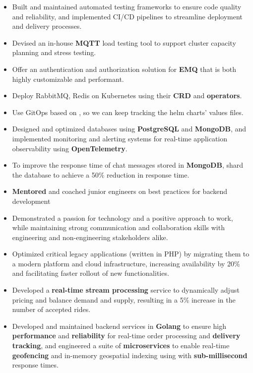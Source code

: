 \vspace{0.5cm}
\begin{itemize}
  \item Built and maintained automated testing frameworks to ensure code quality and reliability,
    and implemented CI/CD pipelines to streamline deployment and delivery processes.
  \item Devised an in-house \textbf{MQTT} load testing tool to support cluster capacity planning and stress testing.
  \item Offer an authentication and authorization solution for \textbf{EMQ} that is both highly customizable and performant.
  \item Deploy RabbitMQ, Redis on Kubernetes using their \textbf{CRD} and \textbf{operators}.
  \item Use GitOps based on , so we can keep tracking the helm charts' values files.
  \item Designed and optimized databases using \textbf{PostgreSQL} and \textbf{MongoDB},
    and implemented monitoring and alerting systems for real-time application observability using \textbf{OpenTelemetry}.
  \item To improve the response time of chat messages stored in \textbf{MongoDB}, shard the database to achieve a 50\% reduction in response time.
  \item \textbf{Mentored} and coached junior engineers on best practices for backend development
  \item Demonstrated a passion for technology and a positive approach to work,
    while maintaining strong communication and collaboration skills with engineering
    and non-engineering stakeholders alike.
\end{itemize}

\vspace{1cm}

\vspace{0.5cm}
\begin{itemize}
  \item Optimized critical legacy applications (written in PHP) by migrating them to a modern platform and cloud infrastructure,
    increasing availability by 20\% and facilitating faster rollout of new functionalities.
  \item Developed a \textbf{real-time stream processing} service to dynamically adjust pricing and balance demand and supply,
    resulting in a 5\% increase in the number of accepted rides.
  \item Developed and maintained backend services in \textbf{Golang} to ensure
    high \textbf{performance} and \textbf{reliability} for real-time order processing and \textbf{delivery tracking},
    and engineered a suite of \textbf{microservices} to enable real-time \textbf{geofencing} and in-memory geospatial
    indexing using  with \textbf{sub-millisecond} response times.
\end{itemize}

